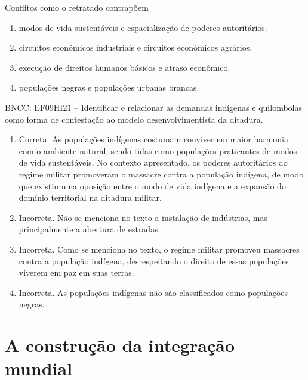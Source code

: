 
Conflitos como o retratado contrapõem

\begin{enumerate}
\def\labelenumi{\alph{enumi})}
\item
  modos de vida sustentáveis e espacialização de poderes autoritários.
\item
  circuitos econômicos industriais e circuitos econômicos agrários.
\item
  execução de direitos humanos básicos e atraso econômico.
\item
  populações negras e populações urbanas brancas.
\end{enumerate}

BNCC: EF09HI21 -- Identificar e relacionar as demandas indígenas e
quilombolas como forma de contestação ao modelo desenvolvimentista da
ditadura.

\begin{enumerate}
\def\labelenumi{\alph{enumi})}
\item
  Correta. As populações indígenas costumam conviver em maior harmonia
  com o ambiente natural, sendo tidas como populações praticantes de
  modos de vida sustentáveis. No contexto apresentado, os poderes
  autoritários do regime militar promoveram o massacre contra a
  população indígena, de modo que existiu uma oposição entre o modo de
  vida indígena e a expansão do domínio territorial na ditadura militar.
\item
  Incorreta. Não se menciona no texto a instalação de indústrias, mas
  principalmente a abertura de estradas.
\item
  Incorreta. Como se menciona no texto, o regime militar promoveu
  massacres contra a população indígena, desrespeitando o direito de
  essas populações viverem em paz em suas terras.
\item
  Incorreta. As populações indígenas não são classificados como
  populações negras.
\end{enumerate}

\chapter{A construção da integração mundial}

